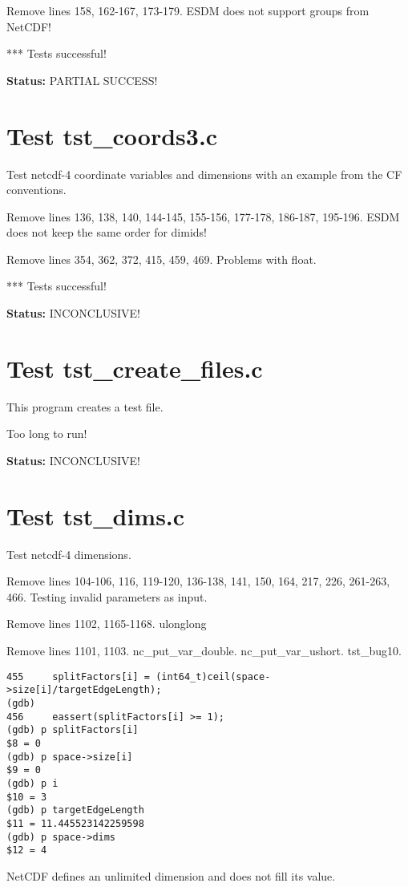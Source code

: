 Remove lines 158, 162-167, 173-179. ESDM does not support groups from NetCDF!

*** Tests successful!

{\bf \large Status: } PARTIAL SUCCESS!

\section{Test tst\_coords3.c}

Test netcdf-4 coordinate variables and dimensions with an example from the CF conventions.

Remove lines 136, 138, 140, 144-145, 155-156, 177-178, 186-187, 195-196. ESDM does not keep the same order for dimids!

Remove lines 354, 362, 372, 415, 459, 469. Problems with float.

*** Tests successful!

{\bf \large Status: } INCONCLUSIVE!

\section{Test tst\_create\_files.c}

This program creates a test file.

Too long to run!

{\bf \large Status: } INCONCLUSIVE!

\section{Test tst\_dims.c}

Test netcdf-4 dimensions.

Remove lines 104-106, 116, 119-120, 136-138, 141, 150, 164, 217, 226, 261-263, 466. Testing invalid parameters as input.

Remove lines 1102, 1165-1168. ulonglong

Remove lines 1101, 1103. nc\_put\_var\_double. nc\_put\_var\_ushort. tst\_bug10.

\begin{verbatim}
455	    splitFactors[i] = (int64_t)ceil(space->size[i]/targetEdgeLength);
(gdb)
456	    eassert(splitFactors[i] >= 1);
(gdb) p splitFactors[i]
$8 = 0
(gdb) p space->size[i]
$9 = 0
(gdb) p i
$10 = 3
(gdb) p targetEdgeLength
$11 = 11.445523142259598
(gdb) p space->dims
$12 = 4
\end{verbatim}

NetCDF defines an unlimited dimension and does not fill its value.

